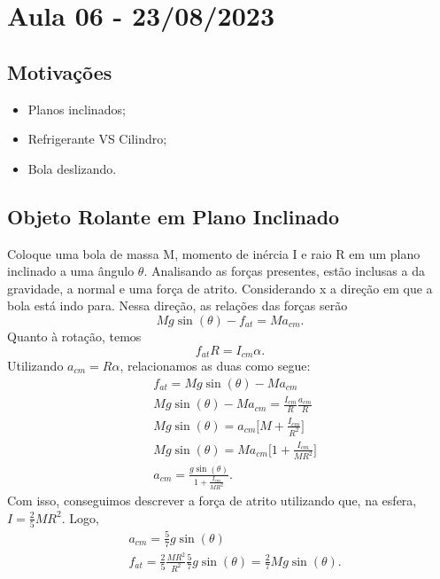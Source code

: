 \documentclass[PhysicsII/physicsII_notes.tex]{subfiles}
\begin{document}
\section{Aula 06 - 23/08/2023}
\subsection{Motivações}
\begin{itemize}
	\item Planos inclinados;
	\item Refrigerante VS Cilindro;
	\item Bola deslizando.
\end{itemize}
\subsection{Objeto Rolante em Plano Inclinado}
Coloque uma bola de massa M, momento de inércia I e raio R em um plano inclinado a uma ângulo \(\theta \).
Analisando as forças presentes, estão inclusas a da gravidade, a normal e uma força de atrito. Considerando x a direção em que a bola
está indo para. Nessa direção, as relações das forças serão
\[
	Mg\sin{(\theta )} - f_{at} = Ma_{cm}.
\]
Quanto à rotação, temos
\[
	f_{at}R = I_{cm}\alpha.
\]
Utilizando \(a_{cm} = R\alpha \), relacionamos as duas como segue:
\begin{align*}
	 & f_{at} = Mg\sin{(\theta )} - Ma_{cm}                               \\
	 & Mg\sin{(\theta )} - Ma_{cm} = \frac{I_{cm}}{R}\frac{a_{cm}}{R}     \\
	 & Mg\sin{(\theta )} = a_{cm}\biggl[M + \frac{I_{cm}}{R^{2}}\biggr]   \\
	 & Mg\sin{(\theta )} = Ma_{cm}\biggl[1 + \frac{I_{cm}}{MR^{2}}\biggr] \\
	 & a_{cm} = \frac{g\sin{(\theta )}}{1 + \frac{I_{cm}}{MR^{2}}}.
\end{align*}
Com isso, conseguimos descrever a força de atrito utilizando que, na esfera, \(I = \frac{2}{5}MR^{2}\). Logo,
\begin{align*}
	 & a_{cm} = \frac{5}{7}g\sin{(\theta )}                                                                \\
	 & f_{at} = \frac{2}{5}\frac{MR^{2}}{R^{2}}\frac{5}{7}g\sin{(\theta )} = \frac{2}{7}Mg\sin{(\theta )}.
\end{align*}
\end{document}
